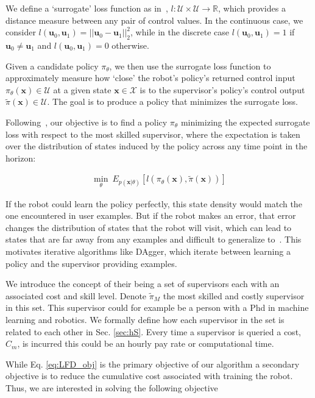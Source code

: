 \documentclass[10pt, conference]{ieeeconf}      %
\newcommand{\bu}{\mathbf{u}}
\newcommand{\bx}{\mathbf{x}}
\begin{document}
We define a `surrogate' loss function as in~\cite{ross2010reduction}, $l:\mathcal{U}\times \mathcal{U}\to \mathbb{R}$, which provides a distance
measure between any pair of control values. In the continuous case, we consider $l(\bu_0,\bu_1) = ||\bu_0-\bu_1||^2_2$,
while in the discrete case $l(\bu_0,\bu_1) = 1$ if $\bu_0 \neq \bu_1$ and $l(\bu_0, \bu_1)=0$ otherwise.


Given a candidate policy $\pi_{\theta}$, we then use the surrogate loss function to approximately measure how `close' the robot's policy's
returned control input $\pi_{\theta}(\bx)\in \mathcal{U}$ at a given state $\bx\in \mathcal{X}$ is to the supervisor's policy's control output
$\tilde{\pi}(\bx)\in \mathcal{U}$. The goal is to produce a policy that minimizes the surrogate loss.

Following~\cite{ross2010reduction}, our objective is to find a policy $\pi_{\theta}$ minimizing the expected surrogate loss with respect to the most skilled supervisor, where the expectation is taken over the distribution of states induced by the policy across any time point in the horizon:

 \vspace{-2ex}
\begin{align}\label{eq:LFD_obj}
\underset{\theta}{\min} \: E_{p(\bx|\theta)} [l(\pi_\theta(\bx),\tilde{\pi}(\bx))]
\end{align}

 If the robot could learn the policy  perfectly, this state density would match the one encountered in user examples. But if the robot makes an error, that error changes the distribution of states that the robot will visit, which can lead to states that are far away from any examples and difficult to generalize to~\cite{pomerleau1989alvinn}. This motivates iterative algorithms like DAgger, which iterate between learning a policy and the supervisor providing examples. 

We  introduce the concept of their being a set of supervisors each with an associated cost and skill level. Denote $\tilde{\pi}_M$ the most skilled and costly supervisor in this set. This supervisor could for example be a person with a Phd in machine learning and robotics. We formally define how each supervisor in the set is related to each other in Sec. \ref{sec:hS}.  Every time a supervisor is queried a cost, $C_m$, is incurred this could be an hourly pay rate or computational time. 

While Eq. \ref{eq:LFD_obj} is the primary objective of our algorithm a secondary objective is to reduce the cumulative cost associated with training the robot. Thus, we are interested in solving the following objective
\end{document}
